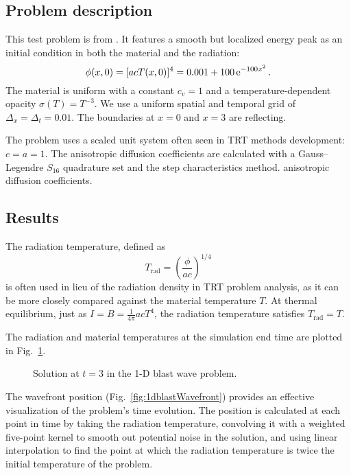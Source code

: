 \subsection{Problem description}
This test problem is from \cite{Rau2005,Ols2007}. It features a smooth but
localized energy peak as an initial condition in both the material and the
radiation:
\begin{equation*}
  \phi(x,0) = [ a c T(x,0)]^{4} = 0.001 + 100 \mathop{}\!\mathrm{e}^{-100 x^2} \,.
\end{equation*}
The material is uniform with a constant $c_v = 1$ and a temperature-dependent
opacity $\sigma(T) = T^{-3}$. We use a uniform spatial and temporal grid of
$\Delta_x = \Delta_t = 0.01$. The boundaries at $x=0$ and $x=3$ are reflecting.

The problem uses a scaled unit system often seen in TRT methods development: $c
= a = 1$. The anisotropic diffusion coefficients are calculated with a
Gauss--Legendre $S_{16}$ quadrature set and the step characteristics method.
anisotropic diffusion coefficients.

\subsection{Results}

The radiation temperature, defined as
\begin{equation}\label{eq:radTemp}
  T_\text{rad} = \left( \frac{\phi}{ac} \right)^{1/4}
\end{equation}
is often used in lieu of the radiation density in TRT problem analysis, as it
can be more closely compared against the material temperature $T$. At
thermal equilibrium, just as $I = B = \frac{1}{4\pi} acT^4$, the radiation
temperature satisfies $T_\text{rad} = T$.

The radiation and material temperatures at the simulation end time are plotted
in Fig.~\ref{fig:1dblastTemp}.

\begin{figure}[htb]
  \centering\small
  \centering
  \caption{Solution at $t=3$ in the 1-D blast wave problem.}
  \label{fig:1dblastTemp}
\end{figure}

The wavefront position (Fig.~\ref{fig:1dblastWavefront}) provides an effective
visualization of the problem's time evolution. The position is calculated at
each point in time by taking the radiation temperature, convolving it with a
weighted five-point kernel to smooth out potential noise in the solution, and
using linear interpolation to find the point at which the radiation temperature
is twice the initial temperature of the problem.

